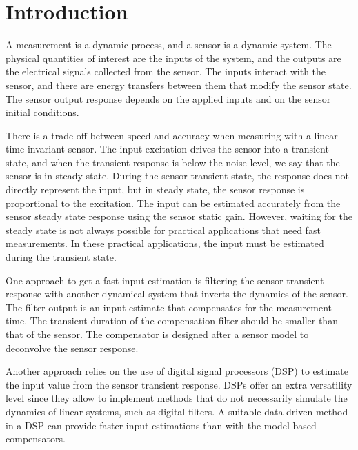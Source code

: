 \chapter{Introduction} \label{chap:Introduction}

\vfill{}

A measurement is a dynamic process, and a sensor is a dynamic system.
The physical quantities of interest are the inputs of the system, and the outputs are the electrical signals collected from the sensor.
The inputs interact with the sensor, and there are energy transfers between them that modify the sensor state.
The sensor output response depends on the applied inputs and on the sensor initial conditions.

There is a trade-off between speed and accuracy when measuring with a linear time-invariant sensor.
The input excitation drives the sensor into a transient state, and when the transient response is below the noise level, we say that the sensor is in steady state.
During the sensor transient state, the response does not directly represent the input, but 
in steady state, the sensor response is proportional to the excitation.
The input can be estimated accurately from the sensor steady state response using the sensor static gain.
However, waiting for the steady state is not always possible for practical applications that need fast measurements.
In these practical applications, the input must be estimated during the transient state.

One approach to get a fast input estimation is filtering the sensor transient response with another dynamical system that inverts the dynamics of the sensor.
The filter output is an input estimate that compensates for the measurement time.
The transient duration of the compensation filter should be smaller than that of the sensor.
The compensator is designed after a sensor model to deconvolve the sensor response.

Another approach relies on the use of digital signal processors (DSP) to estimate the input value from the sensor transient response.
DSPs offer an extra versatility level since they allow to implement methods that do not necessarily simulate the dynamics of linear systems, such as digital filters.
A suitable data-driven method in a DSP can provide faster input estimations than with the model-based compensators.

